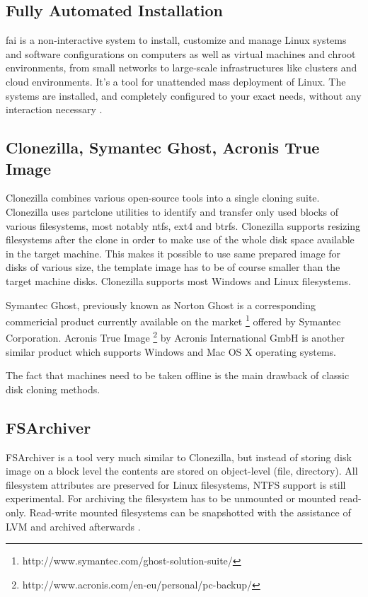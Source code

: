 \documentclass[a4paper,11pt]{kth-mag}
\begin{document}
\subsection{Fully Automated Installation}

\acrfull{fai} is a non-interactive system to install, customize and manage
Linux systems and software configurations on computers as well as
virtual machines and chroot environments, from small networks to
large-scale infrastructures like clusters and cloud environments.
It's a tool for unattended mass deployment of Linux. The systems
are installed, and completely configured to your exact needs,
without any interaction necessary \cite{fai}.

\subsection{Clonezilla, Symantec Ghost, Acronis True Image}

Clonezilla \cite{clonezilla}
combines various open-source tools into a single cloning suite.
Clonezilla uses partclone utilities \cite{partclone} to
identify and transfer only used blocks of various filesystems, most notably
\acrshort{ntfs}, \acrshort{ext4} and \acrshort{btrfs}.
Clonezilla supports resizing filesystems after the clone
in order to make use of the whole disk space available
in the target machine.
This makes it possible to use same prepared image for disks of
various size, the template image has to be of course smaller
than the target machine disks.
Clonezilla supports most Windows and Linux filesystems.

Symantec Ghost, previously known as Norton Ghost is a corresponding commericial
product currently available on the market
\footnote{http://www.symantec.com/ghost-solution-suite/}
offered by Symantec Corporation.
Acronis True Image
\footnote{http://www.acronis.com/en-eu/personal/pc-backup/}
by Acronis International GmbH
is another similar product which supports Windows
and Mac OS X operating systems.

The fact that machines need to be taken offline is the main
drawback of classic disk cloning methods.

\subsection{FSArchiver}

FSArchiver
is a tool very much similar to Clonezilla,
but instead of storing disk image on a block level the
contents are stored on object-level (file, directory).
All filesystem attributes are preserved for Linux filesystems,
NTFS support is still experimental.
For archiving the filesystem has to be unmounted or mounted
read-only. Read-write mounted filesystems can be snapshotted 
with the assistance of LVM and archived afterwards
\cite{fsarchiver}.
\end{document}
